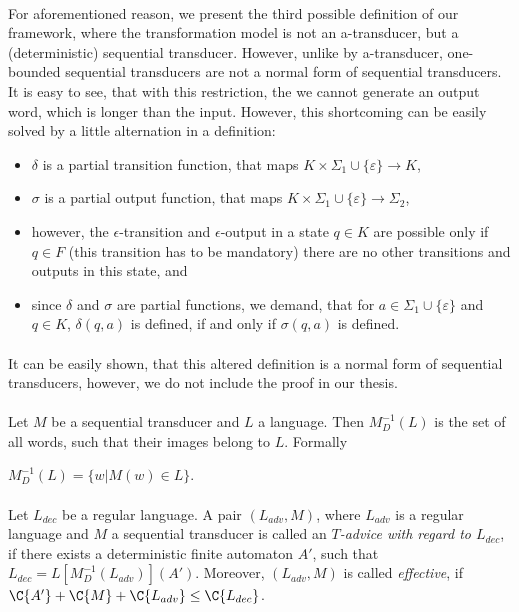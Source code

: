 \paragraph{}
For aforementioned reason, we present the third possible definition of our framework, where the transformation model is not an a-transducer, but a (deterministic) sequential transducer. However, unlike by a-transducer, one-bounded sequential transducers are not a normal form of sequential transducers. It is easy to see, that with this restriction, the we cannot generate an output word, which is longer than the input. However, this shortcoming can be easily solved by a little alternation in a definition:
\begin{itemize}
\item $\delta$ is a partial transition function, that maps $K \times \Sigma_{1} \cup \{\varepsilon\} \rightarrow K$,
\item $\sigma$ is a partial output function, that maps $K \times \Sigma_{1} \cup \{\varepsilon\} \rightarrow \Sigma_{2}$,
\item however, the $\epsilon$-transition and $\epsilon$-output in a state $q \in K$ are possible only if $q \in F$ (this transition has to be mandatory) there are no other transitions and outputs in this state, and
\item since $\delta$ and $\sigma$ are partial functions, we demand, that for $a \in \Sigma_1 \cup \{\varepsilon\}$ and $q \in K$, $\delta(q,a)$ is defined, if and only if $\sigma(q,a)$ is defined.
\end{itemize}

\paragraph{}
It can be easily shown, that this altered definition is a normal form of sequential transducers, however, we do not include the proof in our thesis.

\paragraph{}
\cdefinicia Let $M$ be a sequential transducer and $L$ a language. Then $M_{D}^{-1}(L)$ is the set of all words, such that their images belong to $L$. Formally \\
\centerline{$M_{D}^{-1}(L) = \{ w | M(w) \in L \}$.}

\paragraph{}
\cdefinicia Let $L_{dec}$ be a regular language. A pair $(L_{adv}, M)$, where $L_{adv}$ is a regular language and $M$ a sequential transducer is called an \emph{$T$-advice with regard to $L_{dec}$}, if there exists a deterministic finite automaton $A'$, such that $L_{dec} = L[M_{D}^{-1}(L_{adv})](A')$. Moreover, $(L_{adv}, M)$ is called \emph{effective}, if $\C{A'} + \C{M} + \C{L_{adv}} \leq	 \C{L_{dec}}$.


